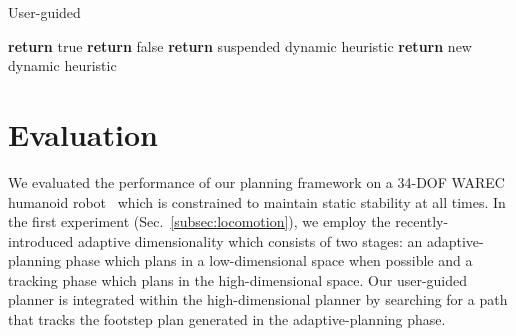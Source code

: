 \documentclass{article}
\begin{document}
\begin{algorithm}[tb]
\caption{User-guided \mhastar}
\label{alg:instantiation}	
\begin{algorithmic}[1]
\small
		\State \textbf{return} true
	\Else
		\State \textbf{return} false
	\EndIf
\EndFunction
%	
\vspace{2mm}
%
%
		\State \textbf{return}  {suspended dynamic heuristic}
	\Else
		\State \textbf{return}	{new dynamic heuristic}
	\EndIf
\EndFunction 
%	
\vspace{2mm}
%
	\Else 	{}
		\Else
		\EndIf
	\EndIf
\EndFunction
\end{algorithmic}
\end{algorithm}

\section{Evaluation }
\label{sec:eval}
We evaluated the performance of our planning framework on a 34-DOF WAREC humanoid robot~\cite{MHSetal15} 
which is constrained to maintain static stability at all times. 
In the first experiment (Sec.~\ref{subsec:locomotion}), we employ the recently-introduced adaptive dimensionality 
which consists of two stages: an adaptive-planning phase which plans in a low-dimensional space when possible and a tracking phase which plans in the high-dimensional space.
Our user-guided planner is integrated within the high-dimensional planner by searching for a path that tracks the footstep plan generated in the adaptive-planning  phase. 
\end{document}
